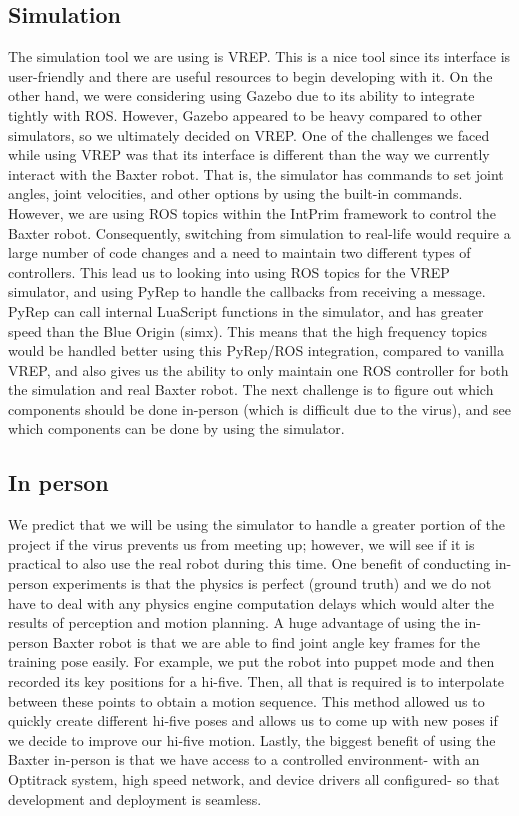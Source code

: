 \documentclass[letterpaper, 10 pt, conference]{ieeeconf}  %
\begin{document}
\subsection{Simulation} 
The simulation tool we are using is VREP. This is a nice tool since its interface is user-friendly and there are useful resources to begin developing with it. On the other hand, we were considering using Gazebo due to its ability to integrate tightly with ROS. However, Gazebo appeared to be heavy compared to other simulators, so we ultimately decided on VREP. One of the challenges we faced while using VREP was that its interface is different than the way we currently interact with the Baxter robot. That is, the simulator has commands to set joint angles, joint velocities, and other options by using the built-in commands. However, we are using ROS topics within the IntPrim framework to control the Baxter robot. Consequently, switching from simulation to real-life would require a large number of code changes and a need to maintain two different types of controllers. This lead us to looking into using ROS topics for the VREP simulator, and using PyRep to handle the callbacks from receiving a message. PyRep can call internal LuaScript functions in the simulator, and has greater speed than the Blue Origin (simx). This means that the high frequency topics would be handled better using this PyRep/ROS integration, compared to vanilla VREP, and also gives us the ability to only maintain one ROS controller for both the simulation and real Baxter robot. The next challenge is to figure out which components should be done in-person (which is difficult due to the virus), and see which components can be done by using the simulator. 
\subsection{In person}
We predict that we will be using the simulator to handle a greater portion of the project if the virus prevents us from meeting up; however, we will see if it is practical to also use the real robot during this time. One benefit of conducting in-person experiments is that the physics is perfect (ground truth) and we do not have to deal with any physics engine computation delays which would alter the results of perception and motion planning. A huge advantage of using the in-person Baxter robot is that we are able to find joint angle key frames for the training pose easily. For example, we put the robot into puppet mode and then recorded its key positions for a hi-five. Then, all that is required is to interpolate between these points to obtain a motion sequence. This method allowed us to quickly create different hi-five poses and allows us to come up with new poses if we decide to improve our hi-five motion. Lastly, the biggest benefit of using the Baxter in-person is that we have access to a controlled environment- with an Optitrack system, high speed network, and device drivers all configured- so that development and deployment is seamless.
\end{document}
